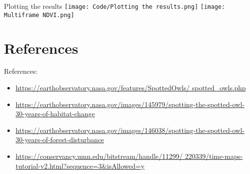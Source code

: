 \documentclass{beamer}
\begin{document}
\begin{frame}{Plotting the results}
    \texttt{[image: Code/Plotting the results.png]}
    \centering
    \texttt{[image: Multiframe NDVI.png]}
\end{frame}

\section{References}

\begin{frame}{}


    \bigskip
    
    \raggedright References:
    \begin{itemize}
    \item \href{https://earthobservatory.nasa.gov/features/SpottedOwls/spotted_owls.php}{https://earthobservatory.nasa.gov/features/SpottedOwls/ spotted\_owls.php}
    \item \href{https://earthobservatory.nasa.gov/images/145979/spotting-the-spotted-owl-30-years-of-habitat-change}{https://earthobservatory.nasa.gov/images/145979/spotting-the-spotted-owl-30-years-of-habitat-change}
    \item \href{https://earthobservatory.nasa.gov/images/146038/spotting-the-spotted-owl-30-years-of-forest-disturbance}{https://earthobservatory.nasa.gov/images/146038/spotting-the-spotted-owl-30-years-of-forest-disturbance}
    \item \href{https://conservancy.umn.edu/bitstream/handle/11299/220339/time-maps-tutorial-v2.html?sequence=3&isAllowed=y}{https://conservancy.umn.edu/bitstream/handle/11299/ 220339/time-maps-tutorial-v2.html?sequence=3\&isAllowed=y}
\end{itemize}
\end{frame}
\end{document}

